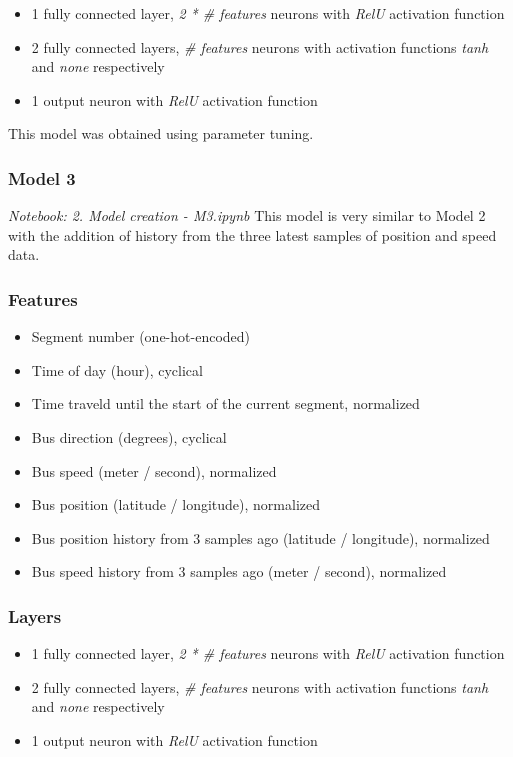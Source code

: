 \begin{itemize}
    \item 1 fully connected layer, \textit{2 * \# features} neurons with \textit{RelU} activation function
    \item 2 fully connected layers, \textit{\# features} neurons with activation functions \textit{tanh} and \textit{none} respectively
    \item 1 output neuron with \textit{RelU} activation function
\end{itemize}

This model was obtained using parameter tuning.

\subsubsection{Model 3}\label{M3}
\textit{Notebook: 2. Model creation - M3.ipynb}
\newline
\noindent This model is very similar to Model 2 with the addition of history from the three latest samples of position and speed data.

\subsubsection{Features}

\begin{itemize}
    \item Segment number (one-hot-encoded)
    \item Time of day (hour), cyclical
    \item Time traveld until the start of the current segment, normalized
    \item Bus direction (degrees), cyclical
    \item Bus speed (meter / second), normalized
    \item Bus position (latitude / longitude), normalized
    \item Bus position history from 3 samples ago (latitude / longitude), normalized
    \item Bus speed history from 3 samples ago (meter / second), normalized
\end{itemize}

\subsubsection{Layers}

\begin{itemize}
    \item 1 fully connected layer, \textit{2 * \# features} neurons with \textit{RelU} activation function
    \item 2 fully connected layers, \textit{\# features} neurons with activation functions \textit{tanh} and \textit{none} respectively
    \item 1 output neuron with \textit{RelU} activation function
\end{itemize}

